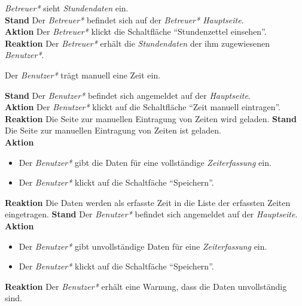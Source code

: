 \begin{requirements}
     \emph{Betreuer*} sieht \emph{Stundendaten} ein. \\
        \textbf{Stand} Der \emph{Betreuer*} befindet sich auf der \emph{Betreuer* Hauptseite}. \\
        \textbf{Aktion} Der \emph{Betreuer*} klickt die Schaltfläche "`Stundenzettel einsehen"'. \\
        \textbf{Reaktion} Der \emph{Betreuer*} erhält die \emph{Stundendaten} der ihm zugewiesenen \emph{Benutzer*}.
        
     Der \emph{Benutzer*} trägt manuell eine Zeit ein.
    \begin{requirements}
            \textbf{Stand} Der \emph{Benutzer*} befindet sich angemeldet auf der \emph{Hauptseite}. \\
            \textbf{Aktion} Der \emph{Benutzer*} klickt auf die Schaltfläche "`Zeit manuell eintragen"'. \\
            \textbf{Reaktion} Die Seite zur manuellen Eintragung von Zeiten wird geladen.
            \textbf{Stand} Die Seite zur manuellen Eintragung von Zeiten ist geladen. \\
            \textbf{Aktion} 
                \begin{itemize}
                    \item Der \emph{Benutzer*} gibt die Daten für eine vollständige \emph{Zeiterfassung} ein.
                    \item Der \emph{Benutzer*} klickt auf die Schaltfäche "`Speichern"'.
               \end{itemize}
            \textbf{Reaktion} Die Daten werden als erfasste Zeit in die Liste der erfassten Zeiten eingetragen.
            \textbf{Stand} Der \emph{Benutzer*} befindet sich angemeldet auf der \emph{Hauptseite}. \\
            \textbf{Aktion}
                \begin{itemize}
                    \item Der \emph{Benutzer*} gibt unvollständige Daten für eine \emph{Zeiterfassung} ein.
                    \item Der \emph{Benutzer*} klickt auf die Schaltfäche "`Speichern"'.
                \end{itemize}
            \textbf{Reaktion} Der \emph{Benutzer*} erhält eine Warnung, dass die Daten unvollständig sind.
    \end{requirements}


\end{requirements}
